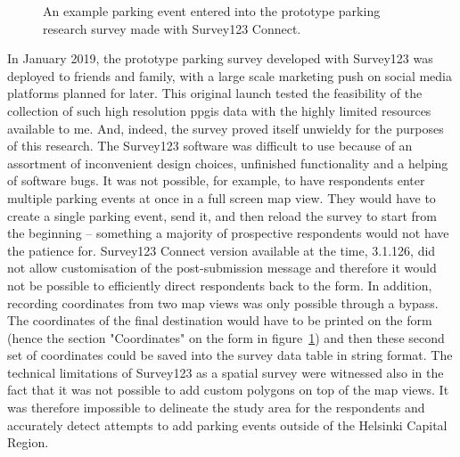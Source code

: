 \begin{figure}[H]%
    \centering
    \quad
    \quad
    \caption[The unused prototype parking survey created with Survey123]{An example parking event entered into the prototype parking research survey made with Survey123 Connect.}%
    \label{fig:survey123}%
\end{figure}

In January 2019, the prototype parking survey developed with Survey123 was deployed to friends and family, with a large scale marketing push on social media platforms planned for later. This original launch tested the feasibility of the collection of such high resolution \gls{ppgis} data with the highly limited resources available to me. And, indeed, the survey proved itself unwieldy for the purposes of this research. The Survey123 software was difficult to use because of an assortment of inconvenient design choices, unfinished functionality and a helping of software bugs. It was not possible, for example, to have respondents enter multiple parking events at once in a full screen map view. They would have to create a single parking event, send it, and then reload the survey to start from the beginning -- something a majority of prospective respondents would not have the patience for. Survey123 Connect version available at the time, 3.1.126, did not allow customisation of the post-submission message and therefore it would not be possible to efficiently direct respondents back to the form. In addition, recording coordinates from two map views was only possible through a bypass. The coordinates of the final destination would have to be printed on the form (hence the section "Coordinates" on the form in figure~\ref{fig:survey123}) and then these second set of coordinates could be saved into the survey data table in string format. The technical limitations of Survey123 as a spatial survey were witnessed also in the fact that it was not possible to add custom polygons on top of the map views. It was therefore impossible to delineate the study area for the respondents and accurately detect attempts to add parking events outside of the Helsinki Capital Region.

